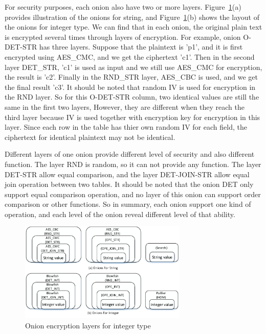 For security purposes, each onion also have two or more layers. Figure~\ref{fig:stack2}(a) provides illustration of the onions for string, and Figure~\ref{fig:stack2}(b) shows the layout of the onions for integer type. We can find that in each onion, the original plain text is encrypted several times through layers of encryption. For example, onion O-DET-STR has three layers. Suppose that the plaintext is 'p1', and it is first encrypted using AES\_CMC, and we get the ciphertext 'c1'. Then in the second layer DET\_STR, 'c1' is used as input and we still use AES\_CMC for encryption, the result is 'c2'. Finally in the RND\_STR layer, AES\_CBC is used, and we get the final result 'c3'. It should be noted that random IV is used for encryption in the RND layer. So for this O-DET-STR column, two identical values are still the same in the first two layers, However, they are different when they reach the third layer because IV is used together with encryption key for encryption in this layer. Since each row in the table has thier own random IV for each field, the ciphertext for identical plaintext may not be identical. 

Different layers of one onion provide different level of security and also different function. The layer RND is random, so it can not provide any function. The layer DET-STR allow equal comparison, and the layer DET-JOIN-STR allow equal join operation between two tables. It should be noted that the onion DET only support equal comparison operation, and no layer of this onion can support order comparison or other functions. So in summary, each onion support one kind of operation, and each level of the onion reveal different level of that ability.





\begin{figure}[tb]
\centering
\includegraphics[width=8cm]{images/Onions.pdf}
\caption{Onion encryption layers for integer type}
\label{fig:stack2}
\end{figure}


